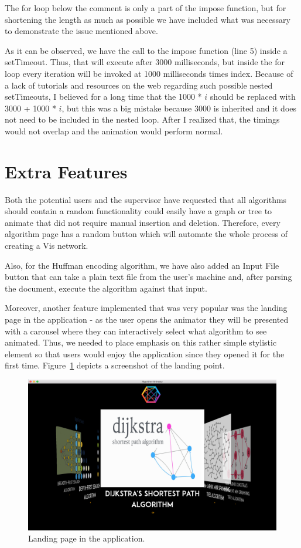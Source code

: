 \documentclass{l4proj}
\begin{document}
The for loop below the comment is only a part of the impose function, but for shortening the length as much as possible
we have included what was necessary to demonstrate the issue mentioned above. 

As it can be observed, we have the call to the impose function (line 5) inside a setTimeout. Thus, that will execute
after 3000 milliseconds, but inside the for loop every iteration will be invoked at 1000 milliseconds times index.
Because of a lack of tutorials and resources on the web regarding such possible nested setTimeouts, I believed for a
long time that the 1000 * $i$ should be replaced with 3000 + 1000 * $i$, but this was a big mistake because 3000 is
inherited and it does not need to be included in the nested loop. After I realized that, the timings would not overlap
and the animation would perform normal.

\section{Extra Features}

Both the potential users and the supervisor have requested that all algorithms should contain a random functionality
could easily have a graph or tree to animate that did not require manual insertion and deletion. Therefore, every
algorithm page has a random button which will automate the whole process of creating a Vis network.

Also, for the Huffman encoding algorithm, we have also added an Input File button that can take a plain text file from
the user's machine and, after parsing the document, execute the algorithm against that input. 

Moreover, another feature implemented that was very popular was the landing page in the application - as
the user opens the animator they will be presented with a carousel where they can interactively select what algorithm
to see animated. Thus, we needed to place emphasis on this rather simple stylistic element so that users would enjoy
the application since they opened it for the first time. Figure~\ref{fig:landing-page} depicts a screenshot of the landing point.

\begin{figure}[!ht]
\centering
\includegraphics[scale=0.3]{landing-page}
\caption{Landing page in the application.}
\label{fig:landing-page}
\end{figure}
\end{document}
